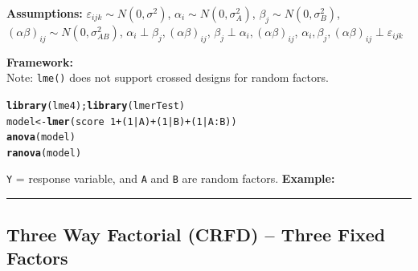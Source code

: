 \documentclass[12pt,english]{article}\usepackage[]{graphicx}\usepackage[table]{xcolor}
\makeatletter
\newcommand{\hlnum}[1]{\textcolor[rgb]{0.686,0.059,0.569}{#1}}%
\newcommand{\hlopt}[1]{\textcolor[rgb]{0,0,0}{#1}}%
\newcommand{\hldef}[1]{\textcolor[rgb]{0.345,0.345,0.345}{#1}}%
\newcommand{\hlkwb}[1]{\textcolor[rgb]{0.69,0.353,0.396}{#1}}%
\newcommand{\hlkwd}[1]{\textcolor[rgb]{0.737,0.353,0.396}{\textbf{#1}}}%
\newenvironment{kframe}{%
 \def\at@end@of@kframe{}%
 \ifinner\ifhmode%
  \def\at@end@of@kframe{\end{minipage}}%
  \begin{minipage}{\columnwidth}%
 \fi\fi%
 \def\FrameCommand##1{\hskip\@totalleftmargin \hskip-\fboxsep
 \colorbox{shadecolor}{##1}\hskip-\fboxsep
     \hskip-\linewidth \hskip-\@totalleftmargin \hskip\columnwidth}%
 \MakeFramed {\advance\hsize-\width
   \@totalleftmargin\z@ \linewidth\hsize
   \@setminipage}}%
 {\par\unskip\endMakeFramed%
 \at@end@of@kframe}
\newenvironment{knitrout}{}{} %
\makeatother
\begin{document}
\noindent \textbf{Assumptions:} $\varepsilon_{ijk} \sim N(0, \sigma^2)$, \hspace{0.1in} $\alpha_i \sim N(0, \sigma^2_A)$,\hspace{0.1in} $\beta_j \sim N(0, \sigma^2_B)$, \hspace{0.1in}  $(\alpha\beta)_{ij} \sim N(0, \sigma^2_{AB})$, \hspace{0.1in} $\alpha_i \perp \beta_j, (\alpha\beta)_{ij}$,\hspace{0.1in} $\beta_j \perp \alpha_i, (\alpha\beta)_{ij}$, \hspace{0.1in}   $\alpha_i, \beta_j,(\alpha\beta)_{ij} \perp \varepsilon_{ijk}$
\vspace{0.1in}

\begin{tcolorbox}[colback=yellow!50!red!25!white,colbacktitle=yellow!50!red,colframe=black!75!white,title=\textbf{R:} Two Random Factors]
\textbf{Framework:}\\

Note: \texttt{lme()} does not support crossed designs for random factors.

\vspace{-.1in}
\begin{knitrout}
\color{fgcolor}\begin{kframe}
\begin{alltt}
\hlkwd{library}\hldef{(lme4);} \hlkwd{library}\hldef{(lmerTest)}
\hldef{model} \hlkwb{<-} \hlkwd{lmer}\hldef{(score} \hlopt{~} \hlnum{1} \hlopt{+} \hldef{(}\hlnum{1}\hlopt{|}\hldef{A)} \hlopt{+} \hldef{(}\hlnum{1}\hlopt{|}\hldef{B)} \hlopt{+} \hldef{(}\hlnum{1}\hlopt{|}\hldef{A}\hlopt{:}\hldef{B))}
\hlkwd{anova}\hldef{(model)}
\hlkwd{ranova}\hldef{(model)}
\end{alltt}
\end{kframe}
\end{knitrout}
\texttt{Y} = response variable, and \texttt{A} and \texttt{B} are random factors.
\vspace{0.1in}
\textbf{Example:}

\end{tcolorbox}
\par\noindent\rule{.9\textwidth}{0.4pt}


\subsection{Three Way Factorial (CRFD) -- Three Fixed Factors}
\end{document}
